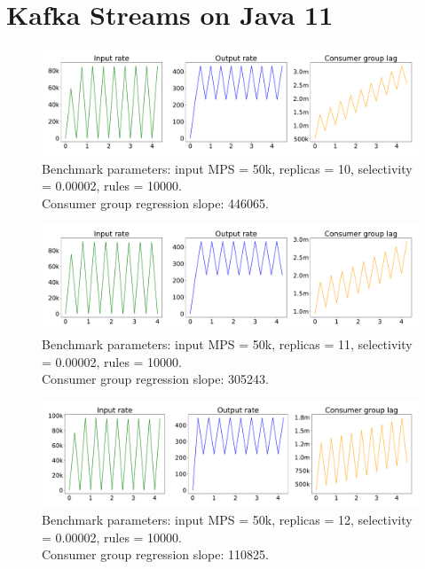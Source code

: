 
\section{Kafka Streams on Java 11}\label{sec:kafka-streams-on-java-11}

\begin{figure}[H]
    \centering
    \includegraphics[width=1\textwidth]{figures/k-streams-java-11-replicas-10}
    \caption{Benchmark parameters: input MPS = 50k, replicas = 10, selectivity = 0.00002, rules = 10000. \\
    Consumer group regression slope: 446065.}
    \label{fig:k-streams-java-11-replicas-10}
\end{figure}

\begin{figure}[H]
    \centering
    \includegraphics[width=1\textwidth]{figures/k-streams-java-11-replicas-11}
    \caption{Benchmark parameters: input MPS = 50k, replicas = 11, selectivity = 0.00002, rules = 10000. \\
    Consumer group regression slope: 305243.}
    \label{fig:k-streams-java-11-replicas-11}
\end{figure}

\begin{figure}[H]
    \centering
    \includegraphics[width=1\textwidth]{figures/k-streams-java-11-replicas-12}
    \caption{Benchmark parameters: input MPS = 50k, replicas = 12, selectivity = 0.00002, rules = 10000. \\
    Consumer group regression slope: 110825.}
    \label{fig:k-streams-java-12-replicas-12}
\end{figure}

